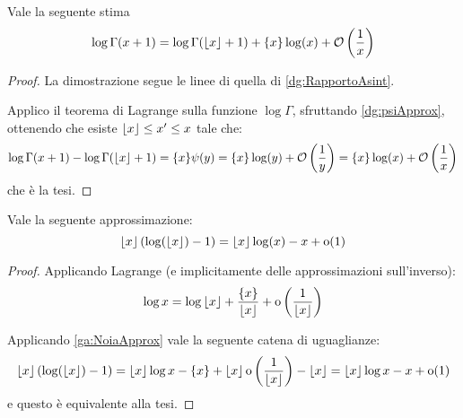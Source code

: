 \begin{lemma}\label{ga:ApproxReali}
	Vale la seguente stima
	\begin{equation*}
		\log{\Gamma(x+1)}=\log{\Gamma(\ensuremath{\left\lfloor x \right\rfloor} +1)}+\{x\}\log(x)+\mathcal{O}\left(\frac 1x\right)
	\end{equation*}
\end{lemma}
\begin{proof}
	La dimostrazione segue le linee di quella di \cref{dg:RapportoAsint}.
	
	Applico il teorema di Lagrange sulla funzione $\log\Gamma$, sfruttando \cref{dg:psiApprox}, ottenendo che esiste
	$\left\lfloor x \right\rfloor\le x'\le x$ tale che:
	\begin{equation}
		\log{\Gamma(x+1)}-\log{\Gamma(\ensuremath{\left\lfloor x \right\rfloor} +1)}=\{x\}\psi(y)=\{x\}\log(y)+\mathcal{O}\left(\frac 1y\right)=
		\{x\}\log(x)+\mathcal{O}\left(\frac 1x\right)
	\end{equation}
	che è la tesi.
\end{proof}

\begin{lemma}\label{ga:StupidaApprox}
	Vale la seguente approssimazione:
	\begin{equation*}
		\left\lfloor x \right\rfloor(\log(\left\lfloor x \right\rfloor)-1)=\left\lfloor x \right\rfloor \log(x)-x+\mathrm{o}(1)
	\end{equation*}
\end{lemma}
\begin{proof}
	Applicando Lagrange (e implicitamente delle approssimazioni sull'inverso):
	\begin{equation}\label{ga:NoiaApprox}
		\log{x}=\log{\ensuremath{\left\lfloor x \right\rfloor}} + \frac{\{x\}}{\left\lfloor x \right\rfloor} +\mathrm{o}\left(\frac 1{\left\lfloor x \right\rfloor}\right)
	\end{equation}
	
	Applicando \cref{ga:NoiaApprox} vale la seguente catena di uguaglianze:
	\begin{equation*}
		\left\lfloor x \right\rfloor(\log(\left\lfloor x \right\rfloor)-1)=\left\lfloor x \right\rfloor\log{x}-\{x\}+
		\left\lfloor x \right\rfloor\mathrm{o}\left(\frac 1{\left\lfloor x \right\rfloor}\right)-\left\lfloor x \right\rfloor=
		\left\lfloor x \right\rfloor\log{x}-x+\mathrm{o}(1)
	\end{equation*}
	e questo è equivalente alla tesi.
\end{proof}



